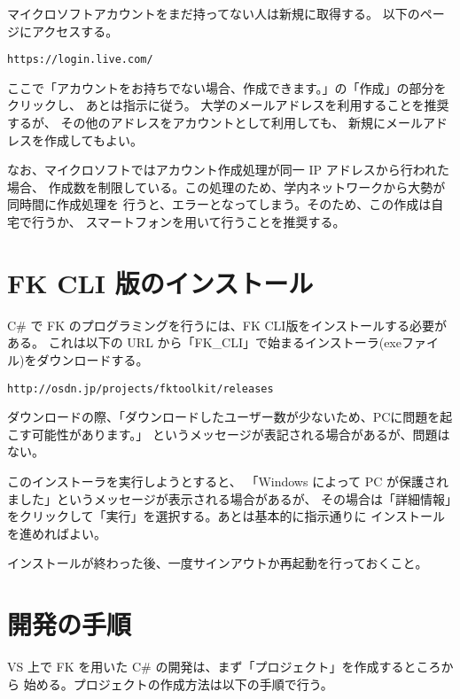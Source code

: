 \documentclass[a4paper]{jsarticle}
\begin{document}
マイクロソフトアカウントをまだ持ってない人は新規に取得する。
以下のページにアクセスする。
\begin{screen}
\begin{center}
	\verb+https://login.live.com/+
\end{center}
\end{screen}
ここで「アカウントをお持ちでない場合、作成できます。」の「作成」の部分をクリックし、
あとは指示に従う。
大学のメールアドレスを利用することを推奨するが、
その他のアドレスをアカウントとして利用しても、
新規にメールアドレスを作成してもよい。

なお、マイクロソフトではアカウント作成処理が同一 IP アドレスから行われた場合、
作成数を制限している。この処理のため、学内ネットワークから大勢が同時間に作成処理を
行うと、エラーとなってしまう。そのため、この作成は自宅で行うか、
スマートフォンを用いて行うことを推奨する。

\section{FK CLI 版のインストール}

C\# で FK のプログラミングを行うには、FK CLI版をインストールする必要がある。
これは以下の URL から「FK\_CLI」で始まるインストーラ(exeファイル)をダウンロードする。

\begin{screen}
\begin{center}
	\verb+http://osdn.jp/projects/fktoolkit/releases+
\end{center}
\end{screen}
ダウンロードの際、「ダウンロードしたユーザー数が少ないため、PCに問題を起こす可能性があります。」
というメッセージが表記される場合があるが、問題はない。

このインストーラを実行しようとすると、
「Windows によって PC が保護されました」というメッセージが表示される場合があるが、
その場合は「詳細情報」をクリックして「実行」を選択する。あとは基本的に指示通りに
インストールを進めればよい。

インストールが終わった後、一度サインアウトか再起動を行っておくこと。

\section{開発の手順}

VS 上で FK を用いた C\# の開発は、まず「プロジェクト」を作成するところから
始める。プロジェクトの作成方法は以下の手順で行う。
\end{document}
